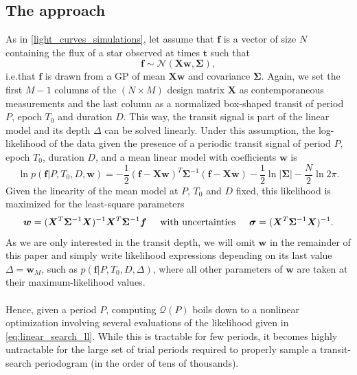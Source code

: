 \documentclass[modern,linenumbers]{aastex631}
\begin{document}
\subsection{The approach}\label{approach}
As in \autoref{light_curves_simulations}, let assume that $\bm{f}$ is a vector of size $N$ containing the flux of a star observed at times $\bm{t}$ such that
\begin{equation*}
    \bm{f} \sim \mathcal{N}(\bm{X w}, \bm{\Sigma}),
\end{equation*}
i.e.\;that $\bm{f}$ is drawn from a GP of mean $\bm{Xw}$ and covariance $\bm{\Sigma}$. Again, we set the first $M-1$ columns of the $(N\times M)$ design matrix $\bm{X}$ as contemporaneous measurements and the last column as a normalized box-shaped transit of period $P$, epoch $T_0$ and duration $D$. This way, the transit signal is part of the linear model and its depth $\Delta$ can be solved linearly. Under this assumption, the log-likelihood of the data given the presence of a periodic transit signal of period $P$, epoch $T_0$, duration $D$, and a mean linear model with coefficients $\bm{w}$ is \citep{Rasmussen2005}
\begin{equation} \label{eq:linear_search_ll}
    \ln p(\bm{f} \vert P, T_0, D, \bm{w}) = -\frac{1}{2}(\bm{f}-\bm{Xw})^T\bm{\Sigma}^{-1}(\bm{f}-\bm{Xw}) -  \frac{1}{2}\ln\vert\bm{\Sigma}\vert - \frac{N}{2}\ln 2\pi.
\end{equation}
Given the linearity of the mean model at $P$, $T_0$ and $D$ fixed, this likelihood is maximized for the least-square parameters
\begin{equation}\label{eq:ls}
    \bm{w} = (\bm{X}^T\bm{\Sigma}^{-1}\bm{X})^{-1}\bm{X}^T\bm{\Sigma}^{-1}\bm{f} \hspace{0.5cm} \text{with  uncertainties} \hspace{0.5cm} \bm{\sigma} = (\bm{X}^T\bm{\Sigma}^{-1}\bm{X})^{-1}.
\end{equation}
As we are only interested in the transit depth, we will omit $\bm{w}$ in the remainder of this paper and simply write likelihood expressions depending on its last value $\Delta=\bm{w}_M$, such as $p(\bm{f} \vert P, T_
0, D, \Delta)$, where all other parameters of $\bm{w}$ are taken at their maximum-likelihood values. \\\\
Hence, given a period $P$, computing $\mathcal{Q}(P)$ boils down to a nonlinear optimization involving several evaluations of the likelihood given in \autoref{eq:linear_search_ll}. While this is tractable for few periods, it becomes highly untractable for the large set of trial periods required to properly sample a transit-search periodogram (in the order of tens of thousands).\\\\
\end{document}
